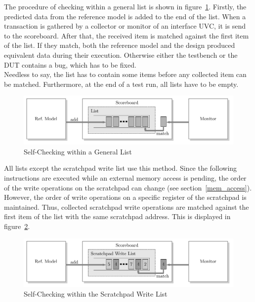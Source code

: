 The procedure of checking within a general list is shown in figure~\ref{fig:scoreboard_flow}. 
Firstly, the predicted data from the reference model is added to the end of the list.
When a transaction is gathered by a collector or monitor of an interface UVC, it is send to the scoreboard.
After that, the received item is matched against the first item of the list.
If they match, both the reference model and the design produced equivalent data during their execution.
Otherwise either the testbench or the DUT contains a bug, which has to be fixed.\\
Needless to say, the list has to contain some items before any collected item can be matched.
Furthermore, at the end of a test run, all lists have to be empty.

\begin{figure}[htb]
 \centering
 \includegraphics[width=1.0\textwidth,angle=0]{images/scoreboard_flow}
 \caption{Self-Checking within a General List}
\label{fig:scoreboard_flow}
\end{figure}

All lists except the scratchpad write list use this method.
Since the following instructions are executed while an external memory access is pending,
the order of the write operations on the scratchpad can change (see section~\ref{mem_access}).
However, the order of write operations on a specific register of the scratchpad is maintained.
Thus, collected scratchpad write operations are matched against the first item of the list with the same scratchpad address.
This is displayed in figure~\ref{fig:scoreboard_scp_write_flow}.

\begin{figure}[htb]
 \centering
 \includegraphics[width=1.0\textwidth,angle=0]{images/scoreboard_scp_write_flow}
 \caption{Self-Checking within the Scratchpad Write List}
\label{fig:scoreboard_scp_write_flow}
\end{figure}


